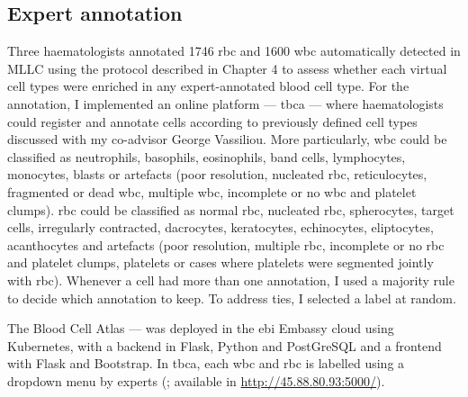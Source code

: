 \begin{figure}[!ht]
    \label{fig:rbc-anaemia-classification-examples}
\end{figure}

\begin{figure}[!ht]
    \label{fig:wbc-anaemia-classification-examples}
\end{figure}

\subsection{Expert annotation}

Three haematologists annotated 1746 \ac{rbc} and 1600 \ac{wbc} automatically detected in MLLC using the protocol described in Chapter 4 to assess whether each virtual cell types were enriched in any expert-annotated blood cell type. For the annotation, I implemented an online platform --- \ac{tbca} --- where haematologists could register and annotate cells according to previously defined cell types discussed with my co-advisor George Vassiliou. More particularly, \ac{wbc} could be classified as neutrophils, basophils, eosinophils, band cells, lymphocytes, monocytes, blasts or artefacts (poor resolution, nucleated \ac{rbc}, reticulocytes, fragmented or dead \ac{wbc}, multiple \ac{wbc}, incomplete or no \ac{wbc} and platelet clumps). \Ac{rbc} could be classified as normal \ac{rbc}, nucleated \ac{rbc}, spherocytes, target cells, irregularly contracted, dacrocytes, keratocytes, echinocytes, eliptocytes, acanthocytes and artefacts (poor resolution, multiple \ac{rbc}, incomplete or no \ac{rbc} and platelet clumps, platelets or cases where platelets were segmented jointly with \ac{rbc}). Whenever a cell had more than one annotation, I used a majority rule to decide which annotation to keep. To address ties, I selected a label at random.

The Blood Cell Atlas --- was deployed in the \ac{ebi} Embassy cloud using Kubernetes, with a backend in Flask, Python and PostGreSQL and a frontend with Flask and Bootstrap. In \ac{tbca}, each \ac{wbc} and \ac{rbc} is labelled using a dropdown menu by experts (; available in \url{http://45.88.80.93:5000/}).


